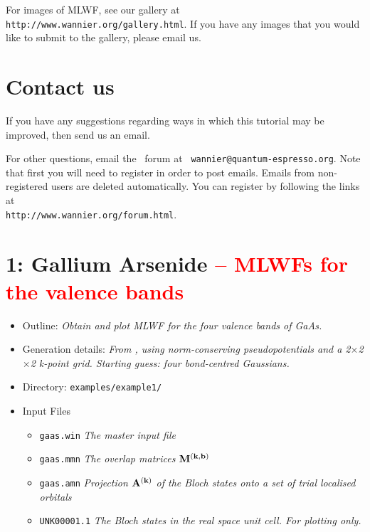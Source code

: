 \documentclass[a4paper,11pt,twoside]{article}
\def\tent#1{\textcolor{red}{#1}}     %
\begin{document}
For images of MLWF, see our gallery at {\tt
  http://www.wannier.org/gallery.html}. If you have any images that
  you would like to submit to the gallery, please email us.

\section*{Contact us}

If you have any suggestions regarding ways in which this tutorial may
be improved, then send us an email.

For other questions, email the \wannier\ forum at {\tt
  wannier@quantum-espresso.org}.  Note that first you will need to
register in order to post emails. Emails from non-registered users are
deleted automatically. You can register by following the links at\\
{\tt http://www.wannier.org/forum.html}.



\cleardoublepage

\section*{1: Gallium Arsenide \tent{-- MLWFs for the valence bands}}

\begin{itemize}
\item{Outline: \it{Obtain and plot MLWF for the four valence
    bands of GaAs.}} 
\item{Generation details: \it{From \pwscf, using norm-conserving
    pseudopotentials and a 2$\times$2$\times$2 k-point grid. Starting
    guess: four bond-centred Gaussians.}}
\item{Directory: {\tt examples/example1/}}
\item{Input Files}
\begin{itemize}
\item{ {\tt gaas.win}  {\it The master input file}}
\item{ {\tt gaas.mmn}  {\it The overlap matrices $\mathbf{M}^{(\mathbf{k},\mathbf{b})}$}}
\item{ {\tt gaas.amn}  {\it Projection $\mathbf{A}^{(\mathbf{k})}$ of the Bloch states onto a set
    of trial localised orbitals}} 
\item{ {\tt UNK00001.1}  {\it The Bloch states in the real space unit
    cell. For plotting only.}} 
\end{itemize}
\end{itemize}
\end{document}
